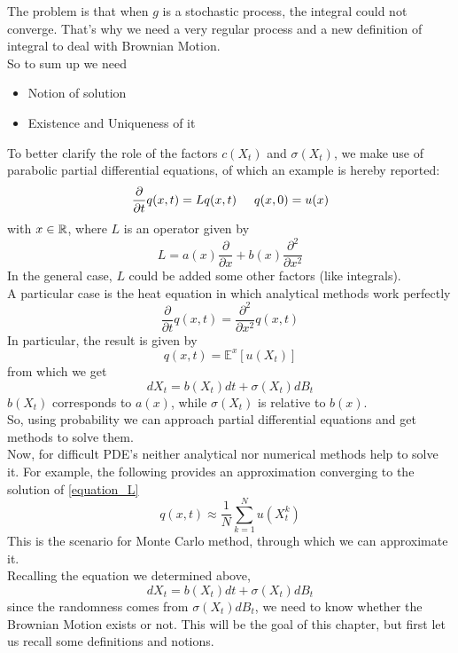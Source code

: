 The problem is that when $g$ is a stochastic process, the integral could not converge. That's why we need a very regular process and a new definition of integral to deal with Brownian Motion. \\
So to sum up we need 
\begin{itemize}
    \item Notion of solution
    \item Existence and Uniqueness of it
\end{itemize}
To better clarify the role of the factors $c(X_t)$ and $\sigma(X_t)$, we make use of parabolic partial differential equations, of which an example is hereby reported:
\begin{equation}
\label{equation_L}
    \frac{\partial}{\partial t} q(x,t)= L q(x,t) \hspace{0.5 cm} q(x,0)=u(x)
\end{equation}
with $x \in \mathbb{R}$, where $L$ is an operator given by 
\begin{equation*}
    L= a(x)\frac{\partial}{\partial x}  + b(x) \frac{\partial^2}{\partial x^2}
\end{equation*}
In the general case, $L$ could be added some other factors (like integrals).\\
A particular case is the heat equation in which analytical methods work perfectly
\begin{equation*}
    \frac{\partial}{\partial t} q(x,t)= \frac{\partial^2}{\partial x^2} q(x,t) 
\end{equation*}
In particular, the result is given by 
\begin{equation*}
    q(x,t) = \mathbb{E}^x[u(X_t)]
\end{equation*}
from which we get 
\begin{equation*}
    dX_t=b(X_t) dt + \sigma(X_t)dB_t
\end{equation*}
$b(X_t)$ corresponds to $a(x)$, while $\sigma(X_t)$ is relative to $b(x)$. \\
So, using probability we can approach partial differential equations and get methods to solve them. \\
Now, for difficult PDE's neither analytical nor numerical methods help to solve it. For example, the following provides an approximation converging to the solution of \eqref{equation_L}
\begin{equation*}
    q(x,t) \approx \frac{1}{N} \sum_{k = 1}^N u(X_t^k)
\end{equation*}
This is the scenario for Monte Carlo method, through which we can approximate it. \\
Recalling the equation we determined above, 
\begin{equation*}
    dX_t = b(X_t) dt + \sigma(X_t)dB_t
\end{equation*}
since the randomness comes from $\sigma(X_t)dB_t$, we need to know whether the Brownian Motion exists or not. This will be the goal of this chapter, but first let us recall some definitions and notions. 
\vspace{2 cm}
